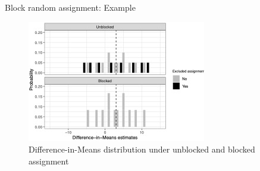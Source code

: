 \documentclass[table, xcolor = {dvipsnames}, 9pt]{beamer}
\theoremstyle{plain}
\begin{document}
\begin{frame}{Block random assignment: Example}
\begin{figure}[H]
\includegraphics[width = \linewidth]{images/blocked_assign_plot.jpg}
\caption{Difference-in-Means distribution under unblocked and blocked assignment}
\end{figure}
\end{frame}%
\end{document}
